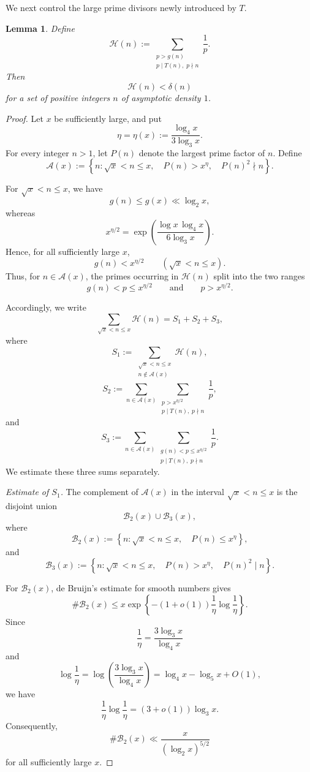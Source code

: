 \documentclass{article}
\newtheorem{lemma}{Lemma}
\begin{document}
We next control the large prime divisors newly introduced by $T$.

\begin{lemma}\label{lem:new-large-primes}
Define
\[
\mathcal H(n)
:=
\sum_{\substack{
p>g(n)\\
p\mid T(n),\;p\nmid n}}
\frac1p.
\]
Then
\[
\mathcal H(n)<\delta(n)
\]
for a set of positive integers $n$ of asymptotic density $1$.
\end{lemma}

\begin{proof}
Let $x$ be sufficiently large, and put
\[
\eta=\eta(x)
:=
\frac{\log_4x}{3\log_3x}.
\]
For every integer $n>1$, let $P(n)$ denote the largest prime factor
of $n$. Define
\[
\mathcal A(x)
:=
\left\{
n:
\sqrt{x}<n\le x,\quad
P(n)>x^\eta,\quad
P(n)^2\nmid n
\right\}.
\]

For $\sqrt{x}<n\le x$, we have
\[
g(n)\le g(x)\ll\log_2x,
\]
whereas
\[
x^{\eta/2}
=
\exp\left(
\frac{\log x\,\log_4x}{6\log_3x}
\right).
\]
Hence, for all sufficiently large $x$,
\[
g(n)<x^{\eta/2}
\qquad
(\sqrt{x}<n\le x).
\]
Thus, for $n\in\mathcal A(x)$, the primes occurring in
$\mathcal H(n)$ split into the two ranges
\[
g(n)<p\le x^{\eta/2}
\qquad\text{and}\qquad
p>x^{\eta/2}.
\]

Accordingly, we write
\begin{equation}
\sum_{\sqrt{x}<n\le x}\mathcal H(n)
=
S_1+S_2+S_3,
\label{eq:H-decomposition}
\end{equation}
where
\[
S_1
:=
\sum_{\substack{
\sqrt{x}<n\le x\\
n\notin\mathcal A(x)}}
\mathcal H(n),
\]
\[
S_2
:=
\sum_{n\in\mathcal A(x)}
\sum_{\substack{
p>x^{\eta/2}\\
p\mid T(n),\;p\nmid n}}
\frac1p,
\]
and
\[
S_3
:=
\sum_{n\in\mathcal A(x)}
\sum_{\substack{
g(n)<p\le x^{\eta/2}\\
p\mid T(n),\;p\nmid n}}
\frac1p.
\]
We estimate these three sums separately.

\medskip
\noindent
\textit{Estimate of $S_1$.}
The complement of $\mathcal A(x)$ in the interval
$\sqrt{x}<n\le x$ is the disjoint union
\[
\mathcal B_2(x)\cup\mathcal B_3(x),
\]
where
\[
\mathcal B_2(x)
:=
\left\{
n:
\sqrt{x}<n\le x,\quad
P(n)\le x^\eta
\right\},
\]
and
\[
\mathcal B_3(x)
:=
\left\{
n:
\sqrt{x}<n\le x,\quad
P(n)>x^\eta,\quad
P(n)^2\mid n
\right\}.
\]

For $\mathcal B_2(x)$, de Bruijn's estimate for smooth numbers
\cite{deBruijn} gives
\[
\#\mathcal B_2(x)
\le
x\exp\left\{
-(1+o(1))
\frac1\eta\log\frac1\eta
\right\}.
\]
Since
\[
\frac1\eta
=
\frac{3\log_3x}{\log_4x}
\]
and
\[
\log\frac1\eta
=
\log\left(
\frac{3\log_3x}{\log_4x}
\right)
=
\log_4x-\log_5x+O(1),
\]
we have
\[
\frac1\eta\log\frac1\eta
=
(3+o(1))\log_3x.
\]
Consequently,
\[
\#\mathcal B_2(x)
\ll
\frac{x}{(\log_2x)^{5/2}}
\]
for all sufficiently large $x$.


\end{proof}
\end{document}
